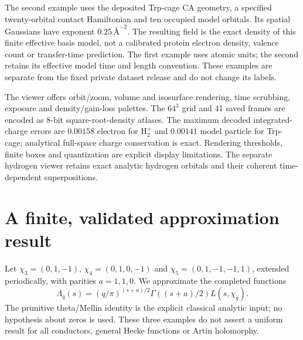 \documentclass[11pt]{article}
\theoremstyle{definition}\newtheorem{definition}[theorem]{Definition}
\theoremstyle{remark}\newtheorem{remark}[theorem]{Remark}
\begin{document}
The second example uses the deposited Trp-cage CA geometry, a specified
twenty-orbital contact Hamiltonian and ten occupied model orbitals. Its
spatial Gaussians have exponent $0.25\,\text{\AA}^{-2}$. The resulting field
is the exact density of this finite effective basis model, not a calibrated
protein electron density, valence count or transfer-time prediction.
The first example uses atomic units; the second retains its effective model
time and length convention. These examples are separate from the fixed
private dataset release and do not change its labels.

The viewer offers orbit/zoom, volume and isosurface rendering, time scrubbing,
exposure and density/gain-loss palettes. The $64^3$ grid and 41 saved frames
are encoded as 8-bit square-root-density atlases. The maximum decoded
integrated-charge errors are $0.00158$ electron for $\mathrm H_2^+$ and
$0.00141$ model particle for Trp-cage; analytical full-space charge
conservation is exact. Rendering thresholds, finite boxes and quantization
are explicit display limitations. The separate hydrogen viewer retains exact
analytic hydrogen orbitals and their coherent time-dependent superpositions.

\section{A finite, validated approximation result}
Let $\chi_3=(0,1,-1)$, $\chi_4=(0,1,0,-1)$ and
$\chi_5=(0,1,-1,-1,1)$, extended periodically, with parities $a=1,1,0$.
We approximate the completed functions
\[
 \Lambda_q(s)=(q/\pi)^{(s+a)/2}\Gamma((s+a)/2)L(s,\chi_q).
\]
The primitive theta/Mellin identity is the explicit classical analytic input;
no hypothesis about zeros is used. These three examples do not assert a
uniform result for all conductors, general Hecke functions or Artin holomorphy.
\end{document}
